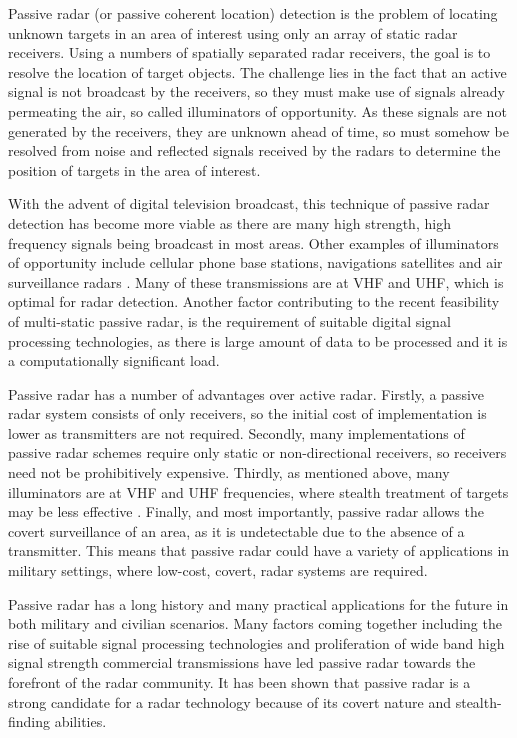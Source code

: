 \documentclass[12pt,openany,a4paper]{book}
\begin{document}
Passive radar (or passive coherent location) detection is the problem of locating unknown targets in an area of interest using only an array of static radar receivers. Using a numbers of spatially separated radar receivers, the goal is to resolve the location of target objects. The challenge lies in the fact that an active signal is not broadcast by the receivers, so they must make use of signals already permeating the air, so called illuminators of opportunity. As these signals are not generated by the receivers, they are unknown ahead of time, so must somehow be resolved from noise and reflected signals received by the radars to determine the position of targets in the area of interest.

\bigskip

With the advent of digital television broadcast, this technique of passive radar detection has become more viable as there are many high strength, high frequency signals being broadcast in most areas. Other examples of illuminators of opportunity include cellular phone base stations, navigations satellites and air surveillance radars \cite{Willis1}. Many of these transmissions are at VHF and UHF, which is optimal for radar detection. Another factor contributing to the recent feasibility of multi-static passive radar, is the requirement of suitable digital signal processing technologies, as there is large amount of data to be processed and it is a computationally significant load. 

\bigskip

Passive radar has a number of advantages over active radar. Firstly, a passive radar system consists of only receivers, so the initial cost of implementation is lower as transmitters are not required. Secondly, many implementations of passive radar schemes require only static or non-directional receivers, so receivers need not be prohibitively expensive. Thirdly, as mentioned above, many illuminators are at VHF and UHF frequencies, where stealth treatment of targets may be less effective \cite{HK2}. Finally, and most importantly, passive radar allows the covert surveillance of an area, as it is undetectable due to the absence of a transmitter. This means that passive radar could have a variety of applications in military settings, where low-cost, covert, radar systems are required.

\bigskip

Passive radar has a long history and many practical applications for the future in both military and civilian scenarios. Many factors coming together including the rise of suitable signal processing technologies and proliferation of wide band high signal strength commercial transmissions have led passive radar towards the forefront of the radar community. It has been shown that passive radar is a strong candidate for a radar technology because of its covert nature and stealth-finding abilities. 
\end{document}

